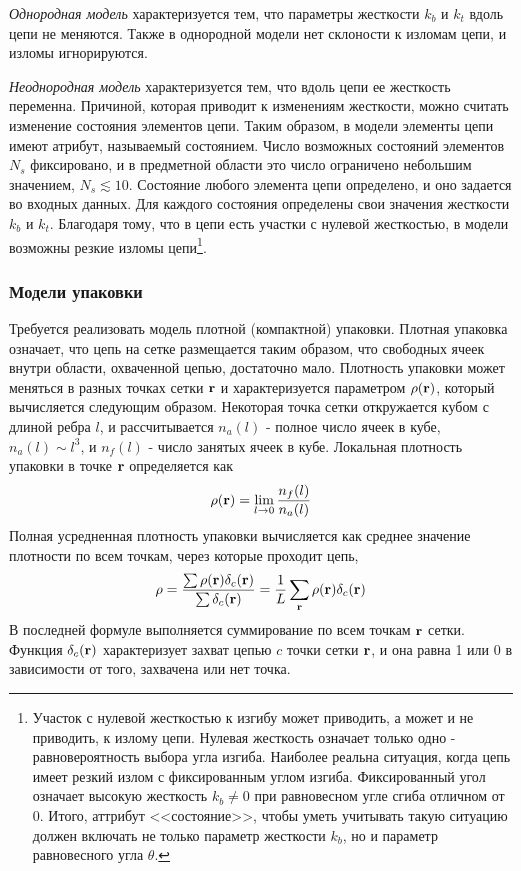 \documentclass[tikz,a4paper]{scrartcl} %
\begin{document}
\textit{Однородная модель} характеризуется тем, что параметры жесткости $k_b$ и $k_t$ вдоль цепи не меняются. Также в однородной модели нет склоности к изломам цепи, и изломы игнорируются.

\textit{Неоднородная модель} характеризуется тем, что вдоль цепи ее жесткость переменна. Причиной, которая приводит к изменениям жесткости, можно считать изменение состояния элементов цепи. Таким образом, в модели элементы цепи имеют атрибут, называемый состоянием. Число возможных состояний элементов $N_s$ фиксировано, и в предметной области это число ограничено небольшим значением, $N_s \lesssim 10$. Состояние любого элемента цепи определено, и оно  задается во входных данных. Для каждого состояния определены свои значения жесткости $k_b$ и $k_t$. Благодаря тому, что в цепи есть участки с нулевой жесткостью, в модели возможны резкие изломы цепи\footnote{Участок с нулевой жесткостью к изгибу может приводить, а может и не приводить, к излому цепи. Нулевая жесткость означает только одно - равновероятность выбора угла изгиба. Наиболее реальна ситуация, когда цепь имеет резкий излом с фиксированным углом изгиба. Фиксированный угол означает высокую жесткость $k_b \neq 0$ при равновесном угле сгиба отличном от 0. Итого, аттрибут <<состояние>>, чтобы уметь учитывать такую ситуацию должен включать не только параметр жесткости $k_b$, но и параметр равновесного угла $\theta$.}.

\subsubsection*{Модели упаковки}
Требуется реализовать модель плотной (компактной) упаковки. Плотная упаковка означает, что цепь на сетке размещается таким образом, что свободных ячеек внутри области, охваченной цепью, достаточно мало. Плотность упаковки может меняться в разных точках сетки $\bold r$ и характеризуется параметром $\rho(\bold r)$, который вычисляется следующим образом. Некоторая точка сетки откружается кубом с длиной ребра $l$, и рассчитывается $n_a(l)$ - полное число ячеек в кубе, $n_a(l) \sim l^3$, и $n_f(l)$ - число занятых ячеек в кубе. Локальная плотность упаковки в точке $\bold r$ определяется как 
\[\rho(\bold r) = \lim_{l\rightarrow 0} \frac{n_f(l)}{n_a(l)} \]
Полная усредненная плотность упаковки вычисляется как среднее значение плотности по всем точкам, через которые проходит цепь, 
\[\rho = \frac{\sum \rho(\bold r)\delta_c(\bold r)}{\sum \delta_c(\bold r)} = \frac{1}{L} \sum_{\bold r} \rho(\bold r)\delta_c(\bold r) \]
В последней формуле выполняется суммирование по всем точкам $\bold r$ сетки.  Функция $\delta_c(\bold r)$ характеризует захват цепью $c$ точки сетки $\bold r$, и она равна 1 или 0 в зависимости от того, захвачена или нет точка. 
\end{document}
